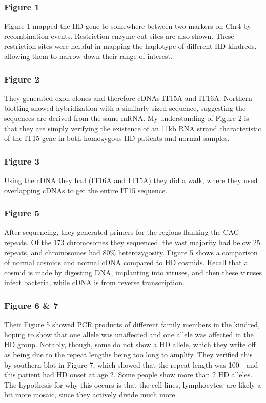 \documentclass[12pt]{report}
\begin{document}
\subsubsection{Figure 1}

Figure 1 mapped the HD gene to somewhere between two markers on Chr4 by recombination events. Restriction enzyme cut sites are also shown. These restriction sites were helpful in mapping the haplotype of different HD kindreds, allowing them to narrow down their range of interest. 

\subsubsection{Figure 2}

They generated exon clones and therefore cDNAs IT15A and IT16A. Northern blotting showed hybridization with a similarly sized sequence, suggesting the sequences are derived from the same mRNA. My understanding of Figure 2 is that they are simply verifying the existence of an 11kb RNA strand characteristic of the IT15 gene in both homozygous HD patients and normal samples. 

\subsubsection{Figure 3}

Using the cDNA they had (IT16A and IT15A) they did a walk, where they used overlapping cDNAs to get the entire IT15 sequence. 

\subsubsection{Figure 5}

After sequencing, they generated primers for the regions flanking the CAG repeats. Of the 173 chromosomes they sequenced, the vast majority had below 25 repeats, and chromosomes had 80\% heterozygosity. Figure 5 shows a comparison of normal cosmids and normal cDNA compared to HD cosmids. Recall that a cosmid is made by digesting DNA, implanting into viruses, and then these viruses infect bacteria, while cDNA is from reverse transcription. 

\subsubsection{Figure 6 \& 7}
Their Figure 5 showed PCR products of different family members in the kindred, hoping to show that one allele was unaffected and one allele was affected in the HD group. Notably, though, some do not show a HD allele, which they write off as being due to the repeat lengths being too long to amplify. They verified this by southern blot in Figure 7, which showed that the repeat length was 100---and this patient had HD onset at age 2. Some people show more than 2 HD alleles. The hypothesis for why this occurs is that the cell lines, lymphocytes, are likely a bit more mosaic, since they actively divide much more. 
\end{document}
